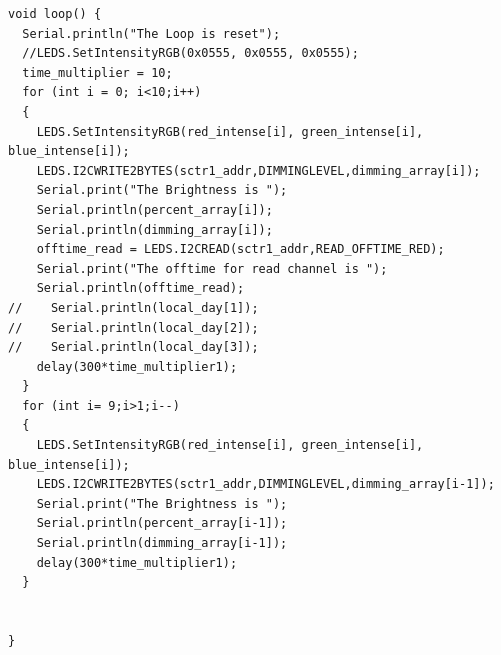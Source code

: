 \documentclass[12pt,a4paper]{report}
\begin{document}
\begin{lstlisting}
void loop() {
  Serial.println("The Loop is reset");
  //LEDS.SetIntensityRGB(0x0555, 0x0555, 0x0555);
  time_multiplier = 10;
  for (int i = 0; i<10;i++)
  {
    LEDS.SetIntensityRGB(red_intense[i], green_intense[i], blue_intense[i]);
    LEDS.I2CWRITE2BYTES(sctr1_addr,DIMMINGLEVEL,dimming_array[i]);
    Serial.print("The Brightness is ");
    Serial.println(percent_array[i]);
    Serial.println(dimming_array[i]);
    offtime_read = LEDS.I2CREAD(sctr1_addr,READ_OFFTIME_RED);
    Serial.print("The offtime for read channel is ");
    Serial.println(offtime_read);
//    Serial.println(local_day[1]);
//    Serial.println(local_day[2]);
//    Serial.println(local_day[3]);
    delay(300*time_multiplier1);
  }
  for (int i= 9;i>1;i--)
  { 
    LEDS.SetIntensityRGB(red_intense[i], green_intense[i], blue_intense[i]);
    LEDS.I2CWRITE2BYTES(sctr1_addr,DIMMINGLEVEL,dimming_array[i-1]);
    Serial.print("The Brightness is ");
    Serial.println(percent_array[i-1]);
    Serial.println(dimming_array[i-1]);
    delay(300*time_multiplier1);
  }
  

}

\end{lstlisting}
\end{document}
